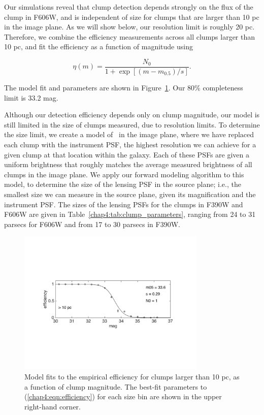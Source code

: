 Our simulations reveal that clump detection depends strongly on the flux of the clump in F606W, and is independent of size for clumps that are larger than 10 pc in the image plane. As we will show below, our resolution limit is roughly 20 pc. Therefore, we combine the efficiency measurements across all clumps larger than 10 pc, and fit the efficiency as a function of magnitude using

\begin{equation}
\eta(m) = \frac{N_0}{1 + \exp[(m-m_{0.5})/s]}.
\label{chap4:eqn:efficiency}
\end{equation}

\noindent The model fit and parameters are shown in Figure~\ref{chap4:fig:efficiency_fits}. Our 80\% completeness limit is 33.2 mag.

Although our detection efficiency depends only on clump magnitude, our model is still limited in the size of clumps measured, due to resolution limits. To determine the size limit, we create a model of \giantarc\ in the image plane, where we have replaced each clump with the instrument PSF, the highest resolution we can achieve for a given clump at that location within the galaxy. Each of these PSFs are given a uniform brightness that roughly matches the average measured brightness of all clumps in the image plane. We apply our forward modeling algorithm to this model, to determine the size of the lensing PSF in the source plane; i.e., the smallest size we can measure in the source plane, given its magnification and the instrument PSF. The sizes of the lensing PSFs for the clumps in F390W and F606W are given in Table~\ref{chap4:tab:clump_parameters}, ranging from 24 to 31 parsecs for F606W and from 17 to 30 parsecs in F390W.

\begin{figure}
\centering
\includegraphics[width=0.8\textwidth]{Chap4/c4f12.pdf}
\caption[Empirical detection efficiency of clumps in \giantarc]{Model fits to the empirical efficiency for clumps larger than 10 pc, as a function of clump magnitude. The best-fit parameters to (\ref{chap4:eqn:efficiency}) for each size bin are shown in the upper right-hand corner.}
\label{chap4:fig:efficiency_fits}
\end{figure}

